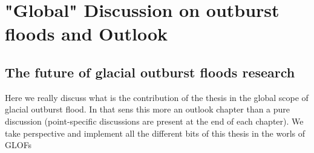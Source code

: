 \chapter{"Global" Discussion on outburst floods and Outlook}
\label{ch:discussion}

\section{The future of glacial outburst floods research}

Here we really discuss what is the contribution of the thesis in the global scope of glacial outburst flood. In that sens this more an outlook chapter than a pure discussion (point-specific discussions are present at the end of each chapter). We take perspective and implement all the different bits of this thesis in the worls of GLOFs








